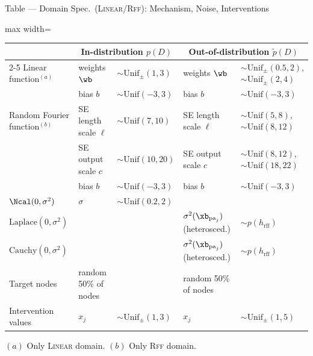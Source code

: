 \documentclass[aspectratio=169,10pt]{beamer}
\newcommand{\domain}[1]{\textsc{#1}}
\newcommand{\lineardomain}{\domain{Linear}\xspace}
\newcommand{\rffdomain}{\domain{Rff}\xspace}
\newcommand{\unif}{\text{Unif}}
\newcommand{\unifpm}{\text{Unif}_{\pm}}
\begin{document}
\begin{frame}{Table --- Domain Spec.\ (\lineardomain/\rffdomain): Mechanism, Noise, Interventions}
\scriptsize
\begin{adjustbox}{max width=\textwidth}
\begin{tabular}{lllll}
\toprule
 & \multicolumn{2}{c}{In-distribution $p(D)$} & \multicolumn{2}{c}{Out-of-distribution $\tilde{p}(D)$} \\
\cmidrule{2-5}
Linear function$^{(a)}$ & weights $\wb$ & $\sim \unifpm(1, 3)$ & weights $\wb$ & $\sim \unifpm(0.5, 2)$, $\sim \unifpm(2, 4)$ \\
& bias $b$ & $\sim \unif(-3, 3)$ & bias $b$ & $\sim \unif(-3, 3)$ \\
\midrule
Random Fourier function$^{(b)}$ & SE length scale $\ell$ & $\sim \unif(7, 10)$ & SE length scale $\ell$ & $\sim \unif(5, 8)$, $\sim \unif(8, 12)$ \\
& SE output scale $c$ & $\sim \unif(10, 20)$ & SE output scale $c$ & $\sim \unif(8, 12)$, $\sim \unif(18, 22)$ \\
& bias $b$ & $\sim \unif(-3, 3)$ & bias  $b$ & $\sim \unif(-3, 3)$ \\
\midrule
$\Ncal(0, \sigma^2)$& $\sigma$ & $\sim \unif(0.2, 2)$ && \\
$\text{Laplace}(0, \sigma^2)$ &&&$\sigma^2(\xb_{\text{pa}_j}) $ (heterosced.) & $ \sim p(h_\text{rff})$\\
$\text{Cauchy}(0, \sigma^2)$ &&&$\sigma^2(\xb_{\text{pa}_j}) $ (heterosced.) & $ \sim p(h_\text{rff})$\\
\midrule
Target nodes & random 50\% of nodes && random 50\% of nodes&\\
Intervention values & $x_j$ & $\sim \unifpm(1, 3)$& $x_j$ & $\sim \unifpm(1, 5)$\\
\bottomrule
\end{tabular}
\end{adjustbox}

\vspace{0.2cm}
{\footnotesize $(a)$ Only \lineardomain domain. $(b)$ Only \rffdomain domain.}
\end{frame}
\end{document}
